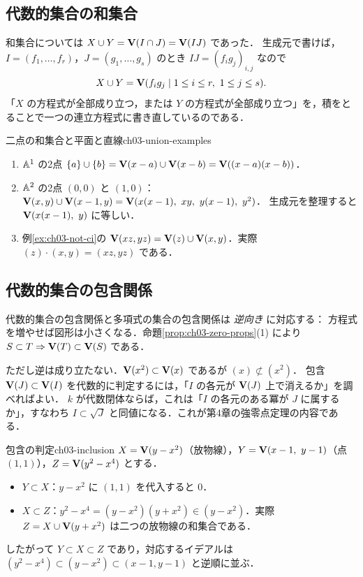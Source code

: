 \subsection{代数的集合の和集合}

和集合については $X\cup Y=\mathbf{V}(I\cap J)=\mathbf{V}(IJ)$ であった．
生成元で書けば，$I=(f_1,\dots,f_r)$，$J=(g_1,\dots,g_s)$ のとき $IJ=(f_ig_j)_{i,j}$ なので
\[
  X\cup Y=\mathbf{V}(f_ig_j\mid 1\le i\le r,\ 1\le j\le s).
\]
「$X$ の方程式が全部成り立つ，または $Y$ の方程式が全部成り立つ」を，積をとることで一つの連立方程式に書き直しているのである．

\begin{myex}{二点の和集合と平面と直線}{ch03-union-examples}
\begin{enumerate}
  \item $\mathbb{A}^1$ の2点 $\{a\}\cup\{b\}=\mathbf{V}(x-a)\cup\mathbf{V}(x-b)=\mathbf{V}((x-a)(x-b))$．
  \item $\mathbb{A}^2$ の2点 $(0,0)$ と $(1,0)$：$\Zero(x,y)\cup\Zero(x-1,y)=\Zero(x(x-1),\ xy,\ y(x-1),\ y^2)$．
        生成元を整理すると $\mathbf{V}(x(x-1),\ y)$ に等しい．
  \item 例\ref{ex:ch03-not-ci}の $\mathbf{V}(xz,yz)=\mathbf{V}(z)\cup\mathbf{V}(x,y)$．実際 $(z)\cdot(x,y)=(xz,yz)$ である．
\end{enumerate}
\end{myex}

\subsection{代数的集合の包含関係}

代数的集合の包含関係と多項式の集合の包含関係は \emph{逆向き} に対応する：
方程式を増やせば図形は小さくなる．命題\ref{prop:ch03-zero-props}(1) により $S\subset T\Rightarrow\mathbf{V}(T)\subset\mathbf{V}(S)$ である．

ただし逆は成り立たない．$\mathbf{V}(x^2)\subset\mathbf{V}(x)$ であるが $(x)\not\subset(x^2)$．
包含 $\mathbf{V}(J)\subset\mathbf{V}(I)$ を代数的に判定するには，「$I$ の各元が $\mathbf{V}(J)$ 上で消えるか」を調べればよい．
$k$ が代数閉体ならば，これは「$I$ の各元のある冪が $J$ に属するか」，すなわち $I\subset\sqrt{J}$ と同値になる．これが第4章の強零点定理の内容である．

\begin{myex}{包含の判定}{ch03-inclusion}
$X=\mathbf{V}(y-x^2)$（放物線），$Y=\mathbf{V}(x-1,\ y-1)$（点 $(1,1)$），$Z=\mathbf{V}(y^2-x^4)$ とする．
\begin{itemize}
  \item $Y\subset X$：$y-x^2$ に $(1,1)$ を代入すると $0$．
  \item $X\subset Z$：$y^2-x^4=(y-x^2)(y+x^2)\in(y-x^2)$．実際 $Z=X\cup\mathbf{V}(y+x^2)$ は二つの放物線の和集合である．
\end{itemize}
したがって $Y\subset X\subset Z$ であり，対応するイデアルは $(y^2-x^4)\subset(y-x^2)\subset(x-1,y-1)$ と逆順に並ぶ．
\end{myex}


